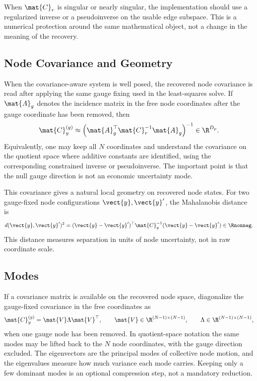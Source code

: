 When $\mat{C}_r$ is singular or nearly singular, the implementation should use
a regularized inverse or a pseudoinverse on the usable edge subspace.  This is a
numerical protection around the same mathematical object, not a change in the
meaning of the recovery.

\subsection{Node Covariance and Geometry}
\label{subsec:node-covariance-and-geometry}

When the covariance-aware system is well posed, the recovered node covariance is
read after applying the same gauge fixing used in the least-squares solve.  If
$\mat{A}_g$ denotes the incidence matrix in the free node coordinates after the
gauge coordinate has been removed, then
\[
  \mat{C}_y^{(g)}
  \approx
  \left(
    \mat{A}_g^{\top}\mat{C}_r^{-1}\mat{A}_g
  \right)^{-1} 
  \in \R^{D_p}.
\]
Equivalently, one may keep all $N$ coordinates and understand the covariance on
the quotient space where additive constants are identified, using the
corresponding constrained inverse or pseudoinverse.  The important point is that
the null gauge direction is not an economic uncertainty mode.

This covariance gives a natural local geometry on recovered node states.  For
two gauge-fixed node configurations $\vect{y},\vect{y}'$, the Mahalanobis
distance is
\[
  d(\vect{y},\vect{y}')^2
  =
  (\vect{y}-\vect{y}')^{\top}
  \mat{C}_y^{-1}
  (\vect{y}-\vect{y}')
  \in\Rnonneg.
\]
This distance measures separation in units of node uncertainty, not in raw
coordinate scale.

\subsection{Modes}
\label{subsec:modes}

If a covariance matrix is available on the recovered node space, diagonalize the
gauge-fixed covariance in the free coordinates as
\[
  \mat{C}_y^{(g)}
  =
  \mat{V}\Lambda\mat{V}^{\top},
  \qquad
  \mat{V}\in\R^{(N-1)\times(N-1)},
  \qquad
  \Lambda\in\R^{(N-1)\times(N-1)},
\]
when one gauge node has been removed.  In quotient-space notation the same modes
may be lifted back to the $N$ node coordinates, with the gauge direction excluded.
The eigenvectors are the principal modes of collective node motion, and the
eigenvalues measure how much variance each mode carries.  Keeping only a few
dominant modes is an optional compression step, not a mandatory reduction.

